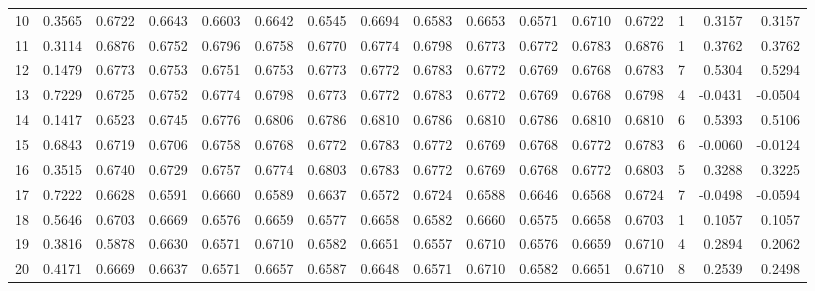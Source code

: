 \begin{tabular}{lrrrrrrrrrrrrrrr}
10  &      0.3565 &  0.6722 &  0.6643 &  0.6603 &  0.6642 &  0.6545 &  0.6694 &  0.6583 &  0.6653 &  0.6571 &   0.6710 &     0.6722 &      1 &                    0.3157 &                     0.3157 \\
11  &      0.3114 &  0.6876 &  0.6752 &  0.6796 &  0.6758 &  0.6770 &  0.6774 &  0.6798 &  0.6773 &  0.6772 &   0.6783 &     0.6876 &      1 &                    0.3762 &                     0.3762 \\
12  &      0.1479 &  0.6773 &  0.6753 &  0.6751 &  0.6753 &  0.6773 &  0.6772 &  0.6783 &  0.6772 &  0.6769 &   0.6768 &     0.6783 &      7 &                    0.5304 &                     0.5294 \\
13  &      0.7229 &  0.6725 &  0.6752 &  0.6774 &  0.6798 &  0.6773 &  0.6772 &  0.6783 &  0.6772 &  0.6769 &   0.6768 &     0.6798 &      4 &                   -0.0431 &                    -0.0504 \\
14  &      0.1417 &  0.6523 &  0.6745 &  0.6776 &  0.6806 &  0.6786 &  0.6810 &  0.6786 &  0.6810 &  0.6786 &   0.6810 &     0.6810 &      6 &                    0.5393 &                     0.5106 \\
15  &      0.6843 &  0.6719 &  0.6706 &  0.6758 &  0.6768 &  0.6772 &  0.6783 &  0.6772 &  0.6769 &  0.6768 &   0.6772 &     0.6783 &      6 &                   -0.0060 &                    -0.0124 \\
16  &      0.3515 &  0.6740 &  0.6729 &  0.6757 &  0.6774 &  0.6803 &  0.6783 &  0.6772 &  0.6769 &  0.6768 &   0.6772 &     0.6803 &      5 &                    0.3288 &                     0.3225 \\
17  &      0.7222 &  0.6628 &  0.6591 &  0.6660 &  0.6589 &  0.6637 &  0.6572 &  0.6724 &  0.6588 &  0.6646 &   0.6568 &     0.6724 &      7 &                   -0.0498 &                    -0.0594 \\
18  &      0.5646 &  0.6703 &  0.6669 &  0.6576 &  0.6659 &  0.6577 &  0.6658 &  0.6582 &  0.6660 &  0.6575 &   0.6658 &     0.6703 &      1 &                    0.1057 &                     0.1057 \\
19  &      0.3816 &  0.5878 &  0.6630 &  0.6571 &  0.6710 &  0.6582 &  0.6651 &  0.6557 &  0.6710 &  0.6576 &   0.6659 &     0.6710 &      4 &                    0.2894 &                     0.2062 \\
20  &      0.4171 &  0.6669 &  0.6637 &  0.6571 &  0.6657 &  0.6587 &  0.6648 &  0.6571 &  0.6710 &  0.6582 &   0.6651 &     0.6710 &      8 &                    0.2539 &                     0.2498 \\

\end{tabular}
